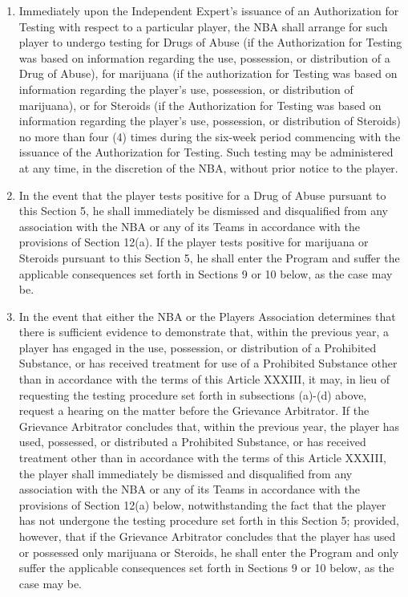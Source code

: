 \documentclass[
]{book}
\begin{document}
\begin{enumerate}
\item
  Immediately upon the Independent Expert's issuance of an Authorization for Testing with respect to a particular player, the NBA shall arrange for such player to undergo testing for Drugs of Abuse (if the Authorization for Testing was based on information regarding the use, possession, or distribution of a Drug of Abuse), for marijuana (if the authorization for Testing was based on information regarding the player's use, possession, or distribution of marijuana), or for Steroids (if the Authorization for Testing was based on information regarding the player's use, possession, or distribution of Steroids) no more than four (4) times during the six-week period commencing with the issuance of the Authorization for Testing. Such testing may be administered at any time, in the discretion of the NBA, without prior notice to the player.
\item
  In the event that the player tests positive for a Drug of Abuse pursuant to this Section 5, he shall immediately be dismissed and disqualified from any association with the NBA or any of its Teams in accordance with the provisions of Section 12(a). If the player tests positive for marijuana or Steroids pursuant to this Section 5, he shall enter the Program and suffer the applicable consequences set forth in Sections 9 or 10 below, as the case may be.
\item
  In the event that either the NBA or the Players Association determines that there is sufficient evidence to demonstrate that, within the previous year, a player has engaged in the use, possession, or distribution of a Prohibited Substance, or has received treatment for use of a Prohibited Substance other than in accordance with the terms of this Article XXXIII, it may, in lieu of requesting the testing procedure set forth in subsections (a)-(d) above, request a hearing on the matter before the Grievance Arbitrator. If the Grievance Arbitrator concludes that, within the previous year, the player has used, possessed, or distributed a Prohibited Substance, or has received treatment other than in accordance with the terms of this Article XXXIII, the player shall immediately be dismissed and disqualified from any association with the NBA or any of its Teams in accordance with the provisions of Section 12(a) below, notwithstanding the fact that the player has not undergone the testing procedure set forth in this Section 5; provided, however, that if the Grievance Arbitrator concludes that the player has used or possessed only marijuana or Steroids, he shall enter the Program and only suffer the applicable consequences set forth in Sections 9 or 10 below, as the case may be.
\end{enumerate}
\end{document}
